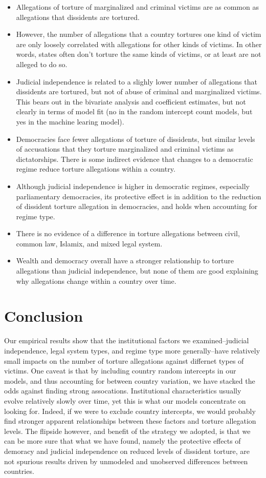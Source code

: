 \documentclass[12pt]{article}
\begin{document}
\begin{itemize}
\item Allegations of torture of marginalized and criminal victims are as common as allegations that dissidents are tortured.
\item However, the number of allegations that a country tortures one kind of victim are only loosely correlated with allegations for other kinds of victims. In other words, states often don't torture the same kinds of victims, or at least are not alleged to do so.
\item Judicial independence is related to a slighly lower number of allegations that dissidents are tortured, but not of abuse of criminal and marginalized victims. This bears out in the bivariate analysis and coefficient estimates, but not clearly in terms of model fit (no in the random intercept count models, but yes in the machine learing model). 
\item Democracies face fewer allegations of torture of dissidents, but similar levels of accusations that they torture marginalized and criminal victims as dictatorships. There is some indirect evidence that changes to a democratic regime reduce torture allegations within a country.
\item Although judicial independence is higher in democratic regimes, especially parliamentary democracies, its protective effect is in addition to the reduction of dissident torture allegation in democracies, and holds when accounting for regime type. 
\item There is no evidence of a difference in torture allegations between civil, common law, Islamix, and mixed legal system. 
\item Wealth and democracy overall have a stronger relationship to torture allegations than judicial independence, but none of them are good explaining why allegations change within a country over time.
\end{itemize}

\section*{Conclusion}

Our empirical results show that the institutional factors we examined--judicial independence, legal system types, and regime type more generally--have relatively small impacts on the number of torture allegations against differnet types of victims. One caveat is that by including country random intercepts in our models, and thus accounting for between country variation, we have stacked the odds against finding strong assocations. Institutional characteristics usually evolve relatively slowly over time, yet this is what our models concentrate on looking for. Indeed, if we were to exclude country intercepts, we would probably find stronger apparent relationships between these factors and torture allegation levels. The flipside however, and benefit of the strategy we adopted, is that we can be more sure that what we have found, namely the protective effects of demoracy and judicial independence on reduced levels of dissident torture, are not spurious results driven by unmodeled and unobserved differences between countries. 
\end{document}
